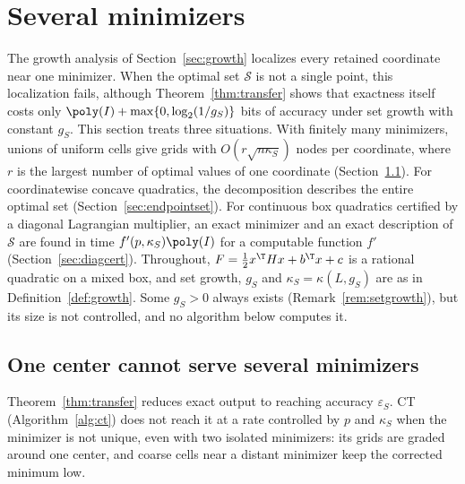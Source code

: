 \section{Several minimizers}\label{sec:optsets}
The growth analysis of Section~\ref{sec:growth} localizes every retained
coordinate near one minimizer. When the optimal set $\mathcal S$ is not a
single point, this localization fails, although Theorem~\ref{thm:transfer}
shows that exactness itself costs only $\poly(I)+\max\{0,\log_2(1/g_S)\}$
bits of accuracy under set growth with constant $g_S$. This section treats three
situations. With finitely many minimizers, unions of uniform cells give grids
with $O(r\sqrt{n\kappa_S})$ nodes per coordinate, where $r$ is the largest
number of optimal values of one coordinate
(Section~\ref{sec:exact-nonunique}). For coordinatewise concave quadratics,
the decomposition describes the entire optimal set
(Section~\ref{sec:endpointset}). For continuous box quadratics certified by a
diagonal Lagrangian multiplier, an exact minimizer and an exact description
of $\mathcal S$ are found in time $f'(p,\kappa_S)\poly(I)$ for a computable
function $f'$ (Section~\ref{sec:diagcert}). Throughout, $F=\frac12x^\T Hx+b^\T x+c$ is a
rational quadratic on a mixed box, and set growth, $g_S$ and
$\kappa_S=\kappa(L,g_S)$ are as in Definition~\ref{def:growth}. Some $g_S>0$
always exists (Remark~\ref{rem:setgrowth}), but its size is not controlled,
and no algorithm below computes it.

\subsection{One center cannot serve several minimizers}\label{sec:exact-nonunique}

Theorem~\ref{thm:transfer} reduces exact output to reaching accuracy
$\varepsilon_S$. CT (Algorithm~\ref{alg:ct}) does not reach it at a rate
controlled by $p$ and $\kappa_S$ when the minimizer is not unique, even with
two isolated minimizers: its grids are graded around one center, and coarse
cells near a distant minimizer keep the corrected minimum low.

